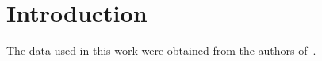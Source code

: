 \section{Introduction}

The data used in this work were obtained from the authors of~\cite{koklu2020multiclass}.
